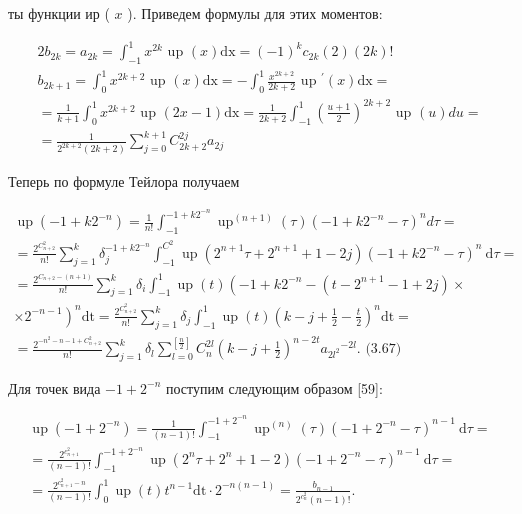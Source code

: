 \documentclass[10pt]{article}
\begin{document}
ты функции ир ( $x$ ). Приведем формулы для этих моментов:


\begin{gather*}
2 b_{2 k}=a_{2 k}=\int_{-1}^{1} x^{2 k} \text { up }(x) \mathrm{dx}=(-1)^{k} c_{2 k}(2)(2 k)!  \tag{3.65}\\
b_{2 k+1}=\int_{0}^{1} x^{2 k+2} \text { up }(x) \mathrm{dx}=-\int_{0}^{1} \frac{x^{2 k+2}}{2 k+2} \text { up }^{\prime}(x) \mathrm{dx}= \\
=\frac{1}{k+1} \int_{0}^{1} x^{2 k+2} \text { up }(2 x-1) \mathrm{dx}=\frac{1}{2 k+2} \int_{-1}^{1}\left(\frac{u+1}{2}\right)^{2 k+2} \text { up }(u) d u= \\
=\frac{1}{2^{2 k+2}(2 k+2)} \sum_{j=0}^{k+1} C_{2 k+2}^{2 j} a_{2 j} \tag{3.66}
\end{gather*}


Теперь по формуле Тейлора получаем


\begin{gather*}
\operatorname{up}\left(-1+k 2^{-n}\right)=\frac{1}{n!} \int_{-1}^{-1+k 2^{-n}} \operatorname{up}^{(n+1)}(\tau)\left(-1+k 2^{-n}-\tau\right)^{n} d \tau= \\
=\frac{2^{C_{n+2}^{2}}}{n!} \sum_{j=1}^{k} \delta_{j}^{-1+k 2^{-n}} \int_{-1}^{C^{2}} \operatorname{up}\left(2^{n+1} \tau+2^{n+1}+1-2 j\right)\left(-1+k 2^{-n}-\tau\right)^{n} \mathrm{~d} \tau= \\
=\frac{2^{C_{n+2}-(n+1)}}{n!} \sum_{j=1}^{k} \delta_{i} \int_{-1}^{1} \operatorname{up}(t)\left(-1+k 2^{-n}-\left(t-2^{n+1}-1+2 j\right) \times\right. \\
\left.\times 2^{-n-1}\right)^{n} \mathrm{dt}=\frac{2^{C_{n+2}^{2}}}{n!} \sum_{j=1}^{k} \delta_{j} \int_{-1}^{1} \operatorname{up}(t)\left(k-j+\frac{1}{2}-\frac{t}{2}\right)^{n} \mathrm{dt}= \\
=\frac{2^{-n^{2}-n-1+C_{n+2}^{2}}}{n!} \sum_{j=1}^{k} \delta_{l} \sum_{l=0}^{\left[\frac{n}{2}\right]} C_{n}^{2 l}\left(k-j+\frac{1}{2}\right)^{n-2 t} a_{2 l^{2}}{ }^{-2 l} . \text { (3.67) } \tag{3.67}
\end{gather*}


Для точек вида $-1+2^{-n}$ поступим следующим образом [59]:


\begin{gather*}
\operatorname{up}\left(-1+2^{-n}\right)=\frac{1}{(n-1)!} \int_{-1}^{-1+2^{-n}} \operatorname{up}^{(n)}(\tau)\left(-1+2^{-n}-\tau\right)^{n-1} \mathrm{~d} \tau= \\
=\frac{2^{c_{n+1}^{2}}}{(n-1)!} \int_{-1}^{-1+2^{-n}} \operatorname{up}\left(2^{n} \tau+2^{n}+1-2\right)\left(-1+2^{-n}-\tau\right)^{n-1} \mathrm{~d} \tau= \\
=\frac{2^{c_{n+1}^{2}-n}}{(n-1)!} \int_{0}^{1} \operatorname{up}(t) t^{n-1} \mathrm{dt} \cdot 2^{-n(n-1)}=\frac{b_{n-1}}{2^{c_{n}^{2}}(n-1)!} . \tag{3.68}
\end{gather*}
\end{document}
